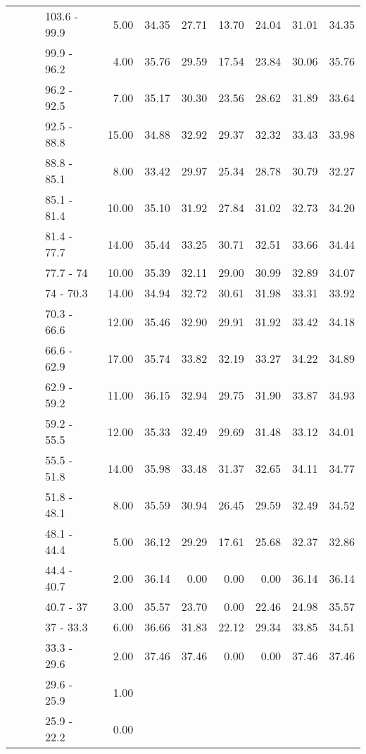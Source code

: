 \begin{longtable}{llllrrrrrrr}
   &  &  & 103.6 - 99.9 & 5.00 & 34.35 & 27.71 & 13.70 & 24.04 & 31.01 & 34.35 \\ 
   &  &  & 99.9 - 96.2 & 4.00 & 35.76 & 29.59 & 17.54 & 23.84 & 30.06 & 35.76 \\ 
   &  &  & 96.2 - 92.5 & 7.00 & 35.17 & 30.30 & 23.56 & 28.62 & 31.89 & 33.64 \\ 
   &  &  & 92.5 - 88.8 & 15.00 & 34.88 & 32.92 & 29.37 & 32.32 & 33.43 & 33.98 \\ 
   &  &  & 88.8 - 85.1 & 8.00 & 33.42 & 29.97 & 25.34 & 28.78 & 30.79 & 32.27 \\ 
   &  &  & 85.1 - 81.4 & 10.00 & 35.10 & 31.92 & 27.84 & 31.02 & 32.73 & 34.20 \\ 
   &  &  & 81.4 - 77.7 & 14.00 & 35.44 & 33.25 & 30.71 & 32.51 & 33.66 & 34.44 \\ 
   &  &  & 77.7 - 74 & 10.00 & 35.39 & 32.11 & 29.00 & 30.99 & 32.89 & 34.07 \\ 
   &  &  & 74 - 70.3 & 14.00 & 34.94 & 32.72 & 30.61 & 31.98 & 33.31 & 33.92 \\ 
   &  &  & 70.3 - 66.6 & 12.00 & 35.46 & 32.90 & 29.91 & 31.92 & 33.42 & 34.18 \\ 
   &  &  & 66.6 - 62.9 & 17.00 & 35.74 & 33.82 & 32.19 & 33.27 & 34.22 & 34.89 \\ 
   &  &  & 62.9 - 59.2 & 11.00 & 36.15 & 32.94 & 29.75 & 31.90 & 33.87 & 34.93 \\ 
   &  &  & 59.2 - 55.5 & 12.00 & 35.33 & 32.49 & 29.69 & 31.48 & 33.12 & 34.01 \\ 
   &  &  & 55.5 - 51.8 & 14.00 & 35.98 & 33.48 & 31.37 & 32.65 & 34.11 & 34.77 \\ 
   &  &  & 51.8 - 48.1 & 8.00 & 35.59 & 30.94 & 26.45 & 29.59 & 32.49 & 34.52 \\ 
   &  &  & 48.1 - 44.4 & 5.00 & 36.12 & 29.29 & 17.61 & 25.68 & 32.37 & 32.86 \\ 
   &  &  & 44.4 - 40.7 & 2.00 & 36.14 & 0.00 & 0.00 & 0.00 & 36.14 & 36.14 \\ 
   &  &  & 40.7 - 37 & 3.00 & 35.57 & 23.70 & 0.00 & 22.46 & 24.98 & 35.57 \\ 
   &  &  & 37 - 33.3 & 6.00 & 36.66 & 31.83 & 22.12 & 29.34 & 33.85 & 34.51 \\ 
   &  &  & 33.3 - 29.6 & 2.00 & 37.46 & 37.46 & 0.00 & 0.00 & 37.46 & 37.46 \\ 
   &  &  & 29.6 - 25.9 & 1.00 &  &  &  &  &  &  \\ 
   &  &  & 25.9 - 22.2 & 0.00 &  &  &  &  &  &  \\ 

\end{longtable}
